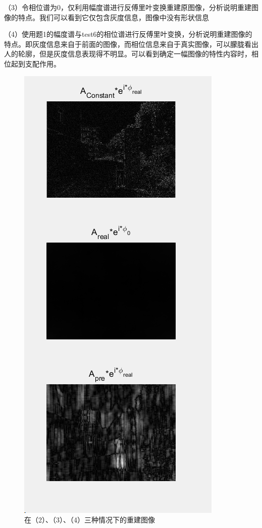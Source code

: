 \documentclass[UTF8]{article} %
\begin{document}
	（3）令相位谱为0，仅利用幅度谱进行反傅里叶变换重建原图像，分析说明重建图像的特点。我们可以看到它仅包含灰度信息，图像中没有形状信息
	
	（4）使用题1的幅度谱与test6的相位谱进行反傅里叶变换，分析说明重建图像的特点。即灰度信息来自于前面的图像，而相位信息来自于真实图像，可以朦胧看出人的轮廓，但是灰度信息表现得不明显。可以看到确定一幅图像的特性内容时，相位起到支配作用。
	\begin{figure}[H]
		\centering
		\includegraphics[width=0.5\linewidth]{screenshot007}
		\caption{在（2）、（3）、（4）三种情况下的重建图像}
		\label{fig:2-6}
	\end{figure}
	
\end{document}

